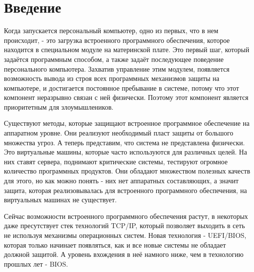 \section{Введение}
Когда запускается персональный компьютер,
	одно из первых,
		что в нем происходит,
	- это загрузка встроенного программного обеспечения,
		которое находится в специальном модуле на материнской плате.
Это первый шаг,
	который задаётся программным способом,
	а также задаёт последующее поведение персонального компьютера.
Захватив управление этим модулем,
	появляется возможность вывода из строя всех программных механизмов защиты на компьютере,
	и достигается постоянное пребывание в системе,
		потому что этот компонент неразрывно связан с ней физически.
Поэтому этот компонент является приоритетным для злоумышлеников.

Существуют методы,
	которые защищают встроенное программное обеспечение на аппаратном уровне.
Они реализуют необходимый пласт защиты от большого множества угроз.
А теперь представим,
	что система не представлена физически.
Это виртуальные машины,
	которые часто используются для различных целей.
На них ставят сервера, поднимают критические системы, тестируют огромное количество программных продуктов.
Они обладают множеством полезных качеств для этого,
	но как можно понять - них нет аппаратных составляющих,
		а значит защита,
			которая реализовывалась для встроенного программного обеспечения,
		на виртуальных машинах не существует.

Сейчас возможности встроенного программного обеспечения растут,
	в некоторых даже пресутствует стек технологий TCP/IP,
		который позволяет выходить в сеть не используя механизмы операционных систем.
Новая технология - UEFI/BIOS,
	которая только начинает появляться,
	как и все новые системы не обладает должной защитой.
А уровень вхождения в неё намного ниже,
	чем в технологию прошлых лет - BIOS.
